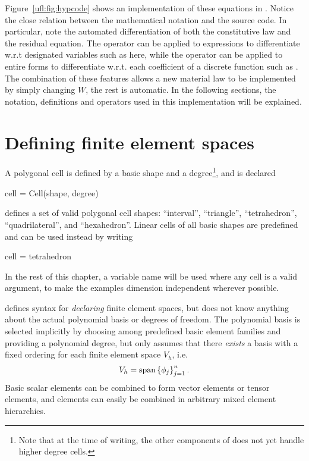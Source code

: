 Figure~\ref{ufl:fig:hypcode} shows an implementation of these
equations in \ufl{}.  Notice the close relation between the
mathematical notation and the \ufl{} source code. In particular, note
the automated differentiation of both the constitutive law and the
residual equation. The operator  can be applied to
expressions to differentiate w.r.t designated variables such as
 here, while the operator  can be applied
to entire forms to differentiate w.r.t. each coefficient of a discrete
function such as .  The combination of these features allows
a new material law to be implemented by simply changing $W$, the rest
is automatic.  In the following sections, the notation, definitions
and operators used in this implementation will be explained.

\section{Defining finite element spaces} \label{ufl:sec:elements}
A polygonal cell is defined by a basic shape and a
degree\footnote{Note that at the time of writing, the other components
of \fenics{} does not yet handle higher degree cells.}, and is
declared
\begin{code}
cell = Cell(shape, degree)
\end{code}
\ufl{} defines a set of valid polygonal cell shapes:
``interval'', ``triangle'', ``tetrahedron'', ``quadrilateral'', and ``hexahedron''.
Linear cells of all basic shapes are predefined and can be used instead by writing
\begin{code}
cell = tetrahedron
\end{code}
In the rest of this chapter, a variable name  will be used
where any cell is a valid argument, to make the examples dimension
independent wherever possible.

\ufl{} defines syntax for \emph{declaring} finite element spaces, but
does not know anything about the actual polynomial basis or degrees of
freedom. The polynomial basis is selected implicitly by choosing among
predefined basic element families and providing a polynomial degree,
but \ufl{} only assumes that there \emph{exists} a basis with a fixed
ordering for each finite element space $V_h$, i.e.
\begin{align}
V_h = \operatorname{span}\left\{ \phi_j \right\}_{j=1}^{n}.
\end{align}
Basic scalar elements can be combined to form vector elements or
tensor elements, and elements can easily be combined in arbitrary
mixed element hierarchies.

